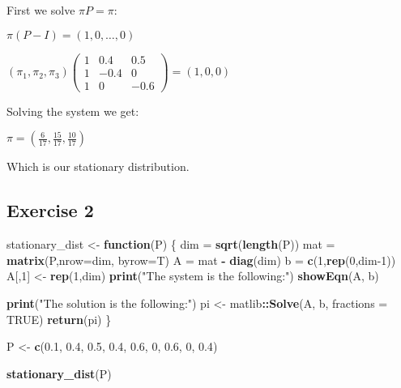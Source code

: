 \documentclass[]{article}
\newenvironment{Shaded}{\begin{snugshade}}{\end{snugshade}}
\newcommand{\ControlFlowTok}[1]{\textcolor[rgb]{0.13,0.29,0.53}{\textbf{#1}}}
\newcommand{\DataTypeTok}[1]{\textcolor[rgb]{0.13,0.29,0.53}{#1}}
\newcommand{\DecValTok}[1]{\textcolor[rgb]{0.00,0.00,0.81}{#1}}
\newcommand{\FloatTok}[1]{\textcolor[rgb]{0.00,0.00,0.81}{#1}}
\newcommand{\KeywordTok}[1]{\textcolor[rgb]{0.13,0.29,0.53}{\textbf{#1}}}
\newcommand{\NormalTok}[1]{#1}
\newcommand{\OperatorTok}[1]{\textcolor[rgb]{0.81,0.36,0.00}{\textbf{#1}}}
\newcommand{\OtherTok}[1]{\textcolor[rgb]{0.56,0.35,0.01}{#1}}
\newcommand{\StringTok}[1]{\textcolor[rgb]{0.31,0.60,0.02}{#1}}
\begin{document}
First we solve \(\pi P = \pi\):

\(\pi (P-I) = (1,0, \dots, 0)\)

\((\pi_{1}, \pi_{2}, \pi_{3}) \begin{pmatrix} 1 & 0.4 & 0.5 \\ 1 & -0.4 & 0 \\ 1 & 0 & -0.6 \end{pmatrix} = (1,0,0)\)

Solving the system we get:

\(\pi = (\frac{6}{17}, \frac{15}{17}, \frac{10}{17})\)

Which is our stationary distribution.

\newpage

\hypertarget{exercise-2}{%
\subsection{Exercise 2}\label{exercise-2}}

\begin{Shaded}
\begin{Highlighting}[]
\NormalTok{stationary_dist <-}\StringTok{ }\ControlFlowTok{function}\NormalTok{(P) \{}
\NormalTok{    dim =}\StringTok{ }\KeywordTok{sqrt}\NormalTok{(}\KeywordTok{length}\NormalTok{(P))}
\NormalTok{    mat =}\StringTok{ }\KeywordTok{matrix}\NormalTok{(P,}\DataTypeTok{nrow=}\NormalTok{dim, }\DataTypeTok{byrow=}\NormalTok{T)}
\NormalTok{    A =}\StringTok{ }\NormalTok{mat }\OperatorTok{-}\StringTok{ }\KeywordTok{diag}\NormalTok{(dim)}
\NormalTok{    b =}\StringTok{ }\KeywordTok{c}\NormalTok{(}\DecValTok{1}\NormalTok{,}\KeywordTok{rep}\NormalTok{(}\DecValTok{0}\NormalTok{,dim}\DecValTok{-1}\NormalTok{))}
\NormalTok{    A[,}\DecValTok{1}\NormalTok{] <-}\StringTok{ }\KeywordTok{rep}\NormalTok{(}\DecValTok{1}\NormalTok{,dim)}
    \KeywordTok{print}\NormalTok{(}\StringTok{"The system is the following:"}\NormalTok{)}
    \KeywordTok{showEqn}\NormalTok{(A, b)}

    \KeywordTok{print}\NormalTok{(}\StringTok{"The solution is the following:"}\NormalTok{)}
\NormalTok{    pi <-}\StringTok{ }\NormalTok{matlib}\OperatorTok{::}\KeywordTok{Solve}\NormalTok{(A, b, }\DataTypeTok{fractions =} \OtherTok{TRUE}\NormalTok{)}
    \KeywordTok{return}\NormalTok{(pi)}
\NormalTok{\}}

\NormalTok{P <-}\StringTok{ }\KeywordTok{c}\NormalTok{(}\FloatTok{0.1}\NormalTok{, }\FloatTok{0.4}\NormalTok{, }\FloatTok{0.5}\NormalTok{,}
       \FloatTok{0.4}\NormalTok{, }\FloatTok{0.6}\NormalTok{,   }\DecValTok{0}\NormalTok{,}
       \FloatTok{0.6}\NormalTok{,   }\DecValTok{0}\NormalTok{, }\FloatTok{0.4}\NormalTok{)}

\KeywordTok{stationary_dist}\NormalTok{(P)}
\end{Highlighting}
\end{Shaded}
\end{document}
